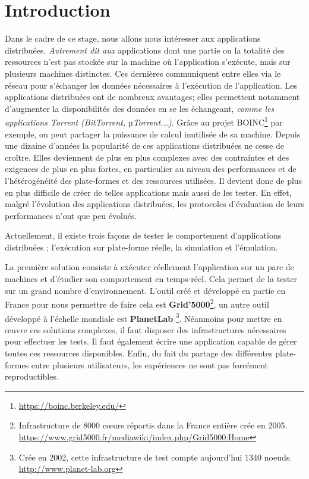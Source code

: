 \section{Introduction}



Dans le cadre de ce stage, nous allons nous intéresser aux applications distribuées. \textit{ Autrement dit aux} applications dont une partie ou la totalité des ressources  n'est pas stockée sur la machine où l'application s'exécute, mais sur plusieurs machines distinctes. Ces dernières communiquent entre elles via le réseau pour s'échanger les données nécessaires à l'exécution de l'application. Les applications distribuées ont de nombreux avantages; elles permettent notamment d'augmenter la disponibilités des données en se les échangeant,\textit{ comme les applications Torrent (BitTorrent, $µ$Torrent...)}. Grâce au projet BOINC\footnote{\url{https://boinc.berkeley.edu/}} par exemple, on peut partager la puissance de calcul inutilisée de sa machine. Depuis une dizaine d'années la popularité de ces applications distribuées ne cesse de croître. Elles deviennent de plus en plus complexes avec des contraintes et des exigences de plus en plus fortes, en particulier au niveau des performances et de l'hétérogénéité des plate-formes et des ressources utilisées. Il devient donc de plus en plus difficile de créer de telles applications mais aussi de les tester. En effet, malgré l'évolution des applications distribuées, les protocoles d'évaluation de leurs performances n'ont que peu évolués.

Actuellement, il existe trois façons de tester le comportement d'applications distribuées \citep{gustedt2009experimental}; l'exécution sur plate-forme réelle, la simulation et l'émulation. 

La première solution consiste à exécuter réellement l'application sur un parc de machines et d'étudier son comportement en temps-réel. Cela permet de la tester sur un grand nombre d'environnement. L'outil créé et développé en partie en France pour nous permettre de faire cela est \textbf{Grid'5000}\footnote{Infrastructure de 8000 c\oe urs répartis dans la France entière crée en 2005. \\ \url{https://www.grid5000.fr/mediawiki/index.php/Grid5000:Home}}\citet{GRID5000}, un autre outil développé à l'échelle mondiale est \textbf{PlanetLab} \footnote{Crée en 2002, cette infrastructure de test compte aujourd'hui 1340 noeuds. \\ \url{http://www.planet-lab.org}}. Néanmoins pour mettre en \oe uvre ces solutions complexes, il faut disposer des infrastructures nécessaires pour effectuer les tests. Il faut également écrire une application capable de gérer toutes ces ressources disponibles. Enfin, du fait du partage des différentes plate-formes entre plusieurs utilisateurs, les expériences ne sont pas forcément reproductibles. 

